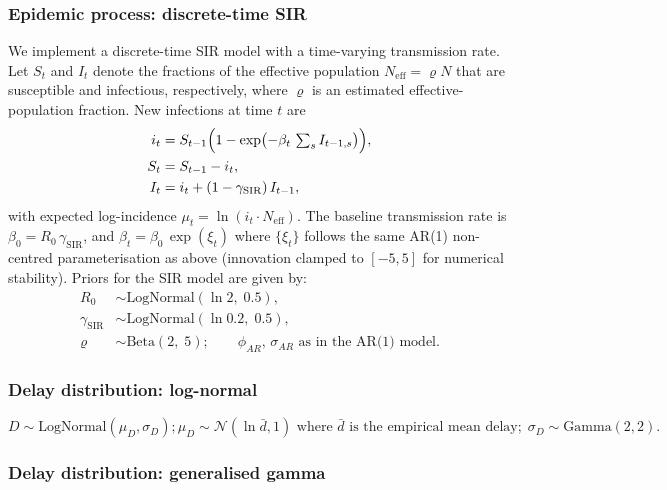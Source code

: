 \documentclass{article}
\begin{document}
\subsubsection*{Epidemic process: discrete-time SIR}

We implement a discrete-time SIR model with a time-varying transmission rate.
Let $S_t$ and $I_t$ denote the fractions of the effective population
$N_{\mathrm{eff}} = \varrho N$ that are susceptible and infectious, respectively,
where $\varrho$ is an estimated effective-population fraction.
New infections at time $t$ are
\begin{align}
  i_t &= S_{t-1}\Bigl(1 - \exp\bigl(-\beta_t\,\textstyle\sum_s I_{t-1,s}\bigr)\Bigr), \\
  S_t &= S_{t-1} - i_t, \\
  I_t &= i_t + (1-\gamma_{\mathrm{SIR}})\,I_{t-1},
\end{align}
with expected log-incidence $\mu_t = \ln(i_t \cdot N_{\mathrm{eff}})$.
The baseline transmission rate is $\beta_0 = R_0\,\gamma_{\mathrm{SIR}}$, and
$\beta_t = \beta_0\,\exp(\xi_t)$ where $\{\xi_t\}$ follows the same AR(1) non-centred
parameterisation as above (innovation clamped to $[-5,5]$ for numerical stability). Priors for the SIR model are given by:
\begin{align}
  R_0 &\sim \mathrm{LogNormal}(\ln 2,\; 0.5), \\
  \gamma_{\mathrm{SIR}} &\sim \mathrm{LogNormal}(\ln 0.2,\; 0.5), \\
  \varrho &\sim \mathrm{Beta}(2,\; 5); \qquad
  \phi_{AR},\,\sigma_{AR}\text{ as in the AR(1) model.}
\end{align}

\subsubsection*{Delay distribution: log-normal}

\begin{equation}
  D \sim \mathrm{LogNormal}(\mu_D,\sigma_D);  \mu_D \sim \mathcal{N}(\ln\bar{d}, 1) \text{ where } \bar{d} \text{ is the empirical mean delay}; \;\sigma_D \sim \mathrm{Gamma}(2,2).
\end{equation}

\subsubsection*{Delay distribution: generalised gamma}
\end{document}
